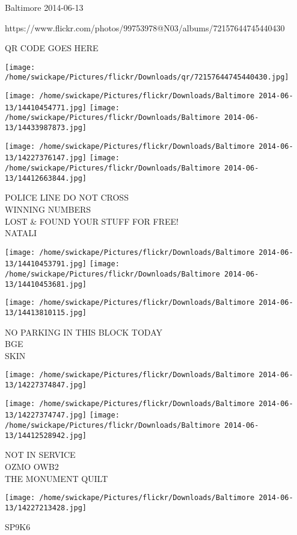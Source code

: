 \documentclass[10pt,letterpaper]{article}
\begin{document}
Baltimore 2014-06-13

https://www.flickr.com/photos/99753978@N03/albums/72157644745440430

QR CODE GOES HERE

\texttt{[image: /home/swickape/Pictures/flickr/Downloads/qr/72157644745440430.jpg]}
\pagebreak

\texttt{[image: /home/swickape/Pictures/flickr/Downloads/Baltimore 2014-06-13/14410454771.jpg]}
\texttt{[image: /home/swickape/Pictures/flickr/Downloads/Baltimore 2014-06-13/14433987873.jpg]}

\texttt{[image: /home/swickape/Pictures/flickr/Downloads/Baltimore 2014-06-13/14227376147.jpg]}
\texttt{[image: /home/swickape/Pictures/flickr/Downloads/Baltimore 2014-06-13/14412663844.jpg]}

POLICE LINE DO NOT CROSS\\
WINNING NUMBERS\\
LOST \& FOUND YOUR STUFF FOR FREE!\\
NATALI\\
\pagebreak

\texttt{[image: /home/swickape/Pictures/flickr/Downloads/Baltimore 2014-06-13/14410453791.jpg]}
\texttt{[image: /home/swickape/Pictures/flickr/Downloads/Baltimore 2014-06-13/14410453681.jpg]}

\texttt{[image: /home/swickape/Pictures/flickr/Downloads/Baltimore 2014-06-13/14413810115.jpg]}

NO PARKING IN THIS BLOCK TODAY\\
BGE\\
SKIN\\
\pagebreak

\texttt{[image: /home/swickape/Pictures/flickr/Downloads/Baltimore 2014-06-13/14227374847.jpg]}

\vspace{0.25in}
\texttt{[image: /home/swickape/Pictures/flickr/Downloads/Baltimore 2014-06-13/14227374747.jpg]}
\texttt{[image: /home/swickape/Pictures/flickr/Downloads/Baltimore 2014-06-13/14412528942.jpg]}

NOT IN SERVICE\\
OZMO OWB2\\
THE MONUMENT QUILT\\
\pagebreak

\texttt{[image: /home/swickape/Pictures/flickr/Downloads/Baltimore 2014-06-13/14227213428.jpg]}

SP9K6\\
\pagebreak
\end{document}

